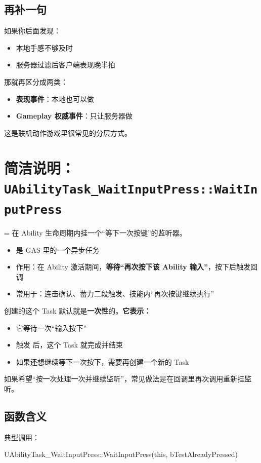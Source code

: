 \subsection{再补一句}
如果你后面发现：
\begin{itemize} \item 本地手感不够及时 \item 服务器过滤后客户端表现晚半拍 \end{itemize}
那就再区分成两类：
\begin{itemize} \item \textbf{表现事件}：本地也可以做 \item \textbf{Gameplay 权威事件}：只让服务器做 \end{itemize}
这是联机动作游戏里很常见的分层方式。




\section{简洁说明：\texttt{UAbilityTask\_WaitInputPress::WaitInputPress}}
 = 在 Ability 生命周期内挂一个“等下一次按键”的监听器。
\begin{itemize}
	\item {} 是 GAS 里的一个异步任务
	\item 作用：在 Ability 激活期间，\textbf{等待“再次按下该 Ability 输入”}，按下后触发回调
	\item 常用于：连击确认、蓄力二段触发、技能内“再次按键继续执行”
\end{itemize}


 创建的这个 Task 默认就是\textbf{一次性}的。\textbf{它表示：}
\begin{itemize}
	\item 它等待一次“输入按下”
	\item 触发  后，这个 Task 就完成并结束
	\item 如果还想继续等下一次按下，需要再创建一个新的  Task
\end{itemize}


如果希望“按一次处理一次并继续监听”，常见做法是在回调里再次调用重新挂监听。


\subsection{函数含义}

典型调用：

\begin{code}
	UAbilityTask_WaitInputPress::WaitInputPress(this, bTestAlreadyPressed)
\end{code}

